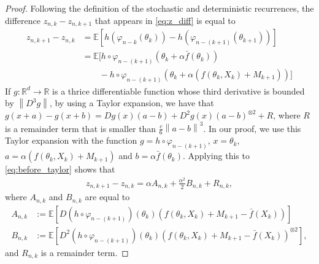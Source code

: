 \documentclass{article}
\newcommand{\R}{\mathbb{R}}
\newcommand\E{\mathbb{E}}
\newcommand\esp[1]{\E\left[#1\right]}
\newcommand\norm[1]{\left\|#1\right\|}
\newcommand\barf{\bar{f}}
\begin{document}
\begin{proof}
    Following the definition of the stochastic and deterministic recurrences, the difference $z_{n, k} - z_{n, k+1}$ that appears in \eqref{eq:z_diff} is equal to 
    \begin{align}
        z_{n, k+1} - z_{n, k}  &= \esp{h(\varphi_{n-k}(\theta_{k})) - h(\varphi_{n-(k+1)}(\theta_{k+1}))}\nonumber\\
        &= \E\big[h\circ\varphi_{n-(k+1)}(\theta_{k} + \alpha \bar{f}(\theta_{k}))\nonumber\\
        &\qquad - h\circ\varphi_{n-(k+1)}(\theta_{k} + \alpha (f(\theta_{k},X_{k})+M_{k+1}))\big] \label{eq:before_taylor}
    \end{align}
    If $g:\R^d\to\R$ is a thrice differentiable function whose third derivative is bounded by $\norm{D^3g}$, by using a Taylor expansion, we have that $g(x+a) - g(x+ b) = Dg(x) (a-b) + D^2g(x) (a-b)^{\otimes2} + R$, where $R$ is a remainder term that is smaller than $\frac{c}{6}\norm{a-b}^3$. In our proof, we use this Taylor expansion with the function $g=h\circ\varphi_{n-(k+1)}$, $x=\theta_{k}$, $a=\alpha(f(\theta_{k},X_{k})+M_{k+1})$ and $b=\alpha\bar{f}(\theta_{k})$. Applying this to \eqref{eq:before_taylor} shows that 
    \begin{align}
        z_{n, k+1} - z_{n, k} = \alpha A_{n,k} + \frac{\alpha^2}{2} B_{n,k} + R_{n,k},
    \end{align}
    where $A_{n,k}$ and $B_{n,k}$ are equal to 
    \begin{align*}
        A_{n,k} &:= \esp{D(h\circ\varphi_{n-(k+1)})(\theta_{k})(f(\theta_{k},X_{k})+M_{k+1}-\barf(X_{k}))}\\
        B_{n,k} &:= \esp{D^2(h\circ\varphi_{n-(k+1)})(\theta_{k}) (f (\theta_{k},X_{k})+M_{k+1}-\barf(X_{k}))^{\otimes 2}},
    \end{align*}
    and $R_{n,k}$ is a remainder term.


\end{proof}
\end{document}
